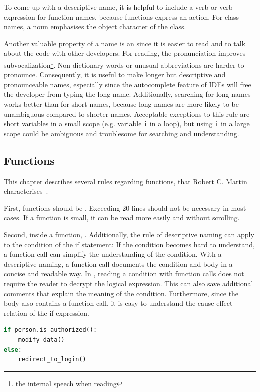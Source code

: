 To come up with a descriptive name, it is helpful to include a verb or verb expression for function names, because functions express an action. For class names, a noun emphasises the object character of the class.

Another valuable property of a name is an  since it is easier to read and to talk about the code with other developers. For reading, the pronunciation improves subvocalization\footnote{the internal speech when reading}. Non-dictionary words or unusual abbreviations are harder to pronounce. Consequently, it is useful to make longer but descriptive and pronounceable names, especially since the autocomplete feature of IDEs will free the developer from typing the long name. Additionally, searching for long names works better than for short names, because long names are more likely to be unambiguous compared to shorter names. Acceptable exceptions to this rule are short variables in a small scope (e.g. variable \texttt{i} in a loop), but using \texttt{i} in a large scope could be ambiguous and troublesome for searching and understanding.


\subsection{Functions}\label{sec:functions}
This chapter describes several rules regarding functions, that Robert C. Martin characterises~\cite{martin_clean_2009}. 

First, functions should be . Exceeding 20 lines should not be necessary in most cases. If a function is small, it can be read more easily and without scrolling. 

Second, inside a function, . Additionally, the rule of descriptive naming can apply to the condition of the if statement: If the condition becomes hard to understand, a function call can simplify the understanding of the condition. With a descriptive naming, a function call documents the condition and body in a concise and readable way. In , reading a condition with function calls does not require the reader to decrypt the logical expression. This can also save additional comments that explain the meaning of the condition. Furthermore, since the body also contains a function call, it is easy to understand the cause-effect relation of the if expression. 

\begin{lstlisting}[float=t , language=Python, label=lst:function_method_call, caption={Sample for using functions in if-statements with the increased documentary value of the cause-effect relationship.}]
if person.is_authorized():
    modify_data()
else:
    redirect_to_login()
\end{lstlisting}


